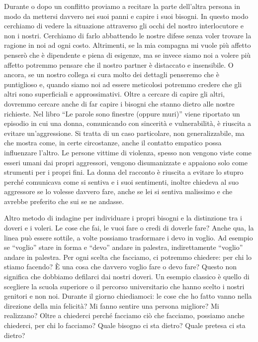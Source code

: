 \documentclass[12pt]{book} %
\begin{document}
Durante o dopo un conflitto proviamo a recitare la parte dell'altra persona in modo da mettersi davvero nei suoi panni e capire
i suoi bisogni. In questo modo cerchiamo di vedere la situazione attraverso gli occhi del nostro interlocutore e non i
nostri. Cerchiamo di farlo abbattendo le nostre difese senza voler trovare la ragione in noi ad ogni costo.
Altrimenti, se la mia compagna mi vuole più affetto penserò che è dipendente e piena di esigenze, ma se invece siamo noi a
volere più affetto potremmo pensare che il nostro partner è distaccato e insensibile. O ancora, se un nostro collega si cura
molto dei dettagli penseremo che è puntiglioso e, quando siamo noi ad essere meticolosi potremmo credere che gli altri sono
superficiali e approssimativi. Oltre a cercare di capire gli altri, dovremmo cercare anche di far capire i bisogni che
stanno dietro alle nostre richieste. Nel libro “Le parole sono finestre (oppure
muri)” viene riportato un episodio in cui una donna, comunicando con sincerità e vulnerabilità, è riuscita a evitare un’aggressione. Si tratta di un caso particolare, non generalizzabile, ma che mostra come, in certe circostanze, anche il contatto empatico possa influenzare l’altro. Le persone vittime di violenza, spesso non vengono viste come esseri umani dai propri aggressori, vengono
disumanizzate e appaiono solo come strumenti per i propri fini. La donna del racconto è riuscita a evitare lo stupro
perché comunicava come si sentiva e i suoi sentimenti, inoltre chiedeva al suo aggressore se lo volesse davvero fare,
anche se lei si sentiva malissimo e che avrebbe preferito che sui se ne andasse. 

Altro metodo di indagine per individuare i propri bisogni e la distinzione tra i doveri e i voleri. Le cose che fai, le
vuoi fare o credi di doverle fare? Anche qua, la linea può essere sottile, a volte possiamo trasformare i devo in
voglio. Ad esempio se “voglio” stare in forma e “devo” andare in palestra, indirettamente “voglio” andare in palestra.
Per ogni scelta che facciamo, ci potremmo chiedere: per chi
lo stiamo facendo? È una cosa che davvero voglio fare o devo fare? Questo non significa che dobbiamo defilarci dai
nostri doveri. Un esempio classico è quello di scegliere la scuola superiore o il percorso universitario che hanno
scelto i nostri genitori e non noi. Durante il giorno chiediamoci: le cose che ho fatto vanno nella direzione della
mia felicità? Mi fanno sentire una persona migliore? Mi realizzano? 
Oltre a chiederci perché facciamo ciò che facciamo, possiamo anche chiederci, per chi lo facciamo?
Quale bisogno ci sta dietro? Quale pretesa ci sta dietro?
\end{document}

